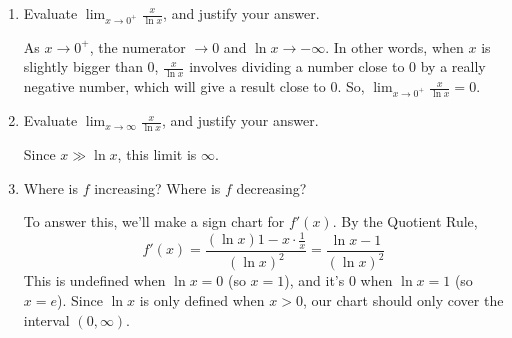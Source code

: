 \documentclass{article}
\theoremstyle{theorem}
\begin{document}
\begin{enumerate}
\begin{enumerate}
  \item %
    \begin{problem}[\stretch{0.5}]
      Evaluate $\displaystyle \lim_{x \to 0^+} \frac{x}{\ln x}$, and justify your answer. 
    \end{problem}

    \begin{solution}
      As $x \to 0^+$, the numerator $\to 0$ and $\ln x \to -\infty$. In other words, when $x$ is slightly bigger than 0, $\frac{x}{\ln x}$ involves dividing a number close to 0 by a really negative number, which will give a result close to 0. So, $\displaystyle \lim_{x \to 0^+} \frac{x}{\ln x} = \boxed{0}$.
    \end{solution}

  \item
    \begin{problem}[\nstretch{0.5}]
      Evaluate $\displaystyle \lim_{x \to \infty} \frac{x}{\ln x}$, and justify your answer. 
    \end{problem}

    \begin{solution}
      Since $x \gg \ln x$, this limit is $\boxed{\infty}$. 
    \end{solution}

  \item
    \begin{problem}[\vfill]
      Where is $f$ increasing? Where is $f$ decreasing?
    \end{problem}

    \begin{solution}
      To answer this, we'll make a sign chart for $f'(x)$. By the Quotient Rule,
      \[ f'(x) = \dfrac{(\ln x) 1 - x \cdot \frac{1}{x}}{(\ln x)^2} = \frac{\ln x - 1}{(\ln x)^2}\]
      This is undefined when $\ln x = 0$ (so $x = 1$), and it's 0 when $\ln x = 1$ (so $x = e$). Since $\ln x$ is only defined when $x > 0$, our chart should only cover the interval $(0, \infty)$.


\end{solution}
\end{enumerate}
\end{enumerate}
\end{document}
